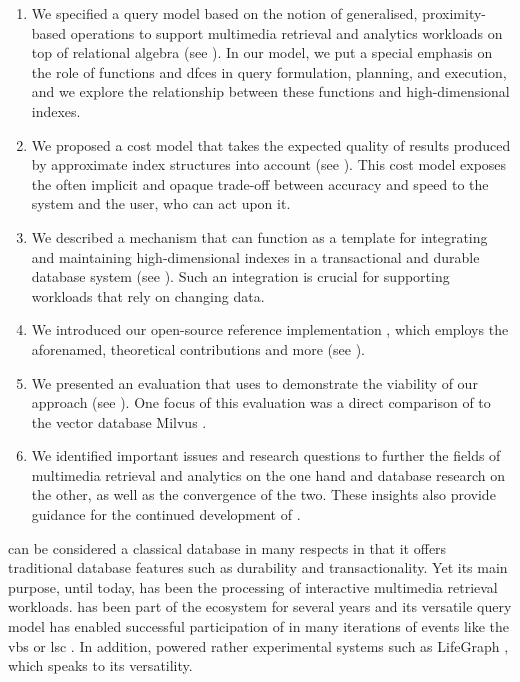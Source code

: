 \begin{enumerate}
    \item We specified a query model based on the notion of generalised, proximity-based operations to support multimedia retrieval and analytics workloads on top of relational algebra (see ). In our model, we put a special emphasis on the role of functions and \acrlong{dfc}es in query formulation, planning, and execution, and we explore the relationship between these functions and high-dimensional indexes.
    \item We proposed a cost model that takes the expected quality of results produced by approximate index structures into account (see ). This cost model exposes the often implicit and opaque trade-off between accuracy and speed to the system and the user, who can act upon it.
    \item We described a mechanism that can function as a template for integrating and maintaining high-dimensional indexes in a transactional and durable database system (see ). Such an integration is crucial for supporting workloads that rely on changing data.
    \item We introduced our open-source reference implementation \cottontail{}, which employs the aforenamed, theoretical contributions and more (see ). 
    \item We presented an evaluation that uses \cottontail{} to demonstrate the viability of our approach (see ). One focus of this evaluation was a direct comparison of \cottontail{} to the vector database Milvus \cite{Wang:2021Milvus}.
    \item We identified important issues and research questions to further the fields of multimedia retrieval and analytics on the one hand and database research on the other, as well as the convergence of the two. These insights also provide guidance for the continued development of \cottontail{}.
\end{enumerate}

\cottontail{} can be considered a classical database in many respects in that it offers traditional database features such as durability and transactionality. Yet its main purpose, until today, has been the processing of interactive multimedia retrieval workloads. \cottontail{} has been part of the \vitrivr{} ecosystem \cite{Rossetto:2016Vitrivr,Gasser:2019Multimodal} for several years and its versatile query model has enabled successful participation of \vitrivr{} in many iterations of events like the \acrshort{vbs} \cite{Rossetto:2019Deep,Sauter:2020Combining,Spiess:2021Competitive,Heller:2022Multi} or \acrshort{lsc} \cite{Spiess:2021Exploring,Heller:2020Interactive,Heller:2021Interactive,Spiess:2022Multi}. In addition, \cottontail{} powered rather experimental systems such as LifeGraph \cite{Rossetto:2021Exploring}, which speaks to its versatility.

